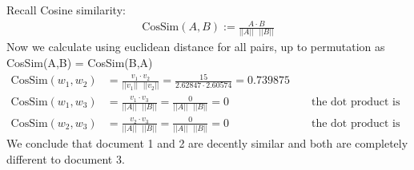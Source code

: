 \documentclass{article}
\theoremstyle{remark}
\begin{document}
	\noindent Recall Cosine similarity:
	\begin{align*}
	\text{CosSim}(A,B) := \frac{A\cdot B}{||A||\text{ }||B||}
	\end{align*}
	Now we calculate using euclidean distance for all pairs, up to permutation as CosSim(A,B) = CosSim(B,A)
	\begin{align*}
	\text{CosSim}(w_1,w_2) &= \frac{v_1\cdot v_2}{||v_1||\text{ }||v_2||} = \frac{15}{2.62847\cdot2.60574} = 0.739875 \\
	\text{CosSim}(w_1,w_3) &= \frac{v_1\cdot v_3}{||A||\text{ }||B||} =  \frac{0}{||A||\text{ }||B||} = 0 &&\text{ the dot product is clearly 0}\\
	\text{CosSim}(w_2,w_3) &= \frac{v_2\cdot v_3}{||A||\text{ }||B||} =  \frac{0}{||A||\text{ }||B||} = 0 &&\text{ the dot product is clearly 0}
	\end{align*}
	We conclude that document 1 and 2 are decently similar and both are completely different to document 3.
\end{document}
